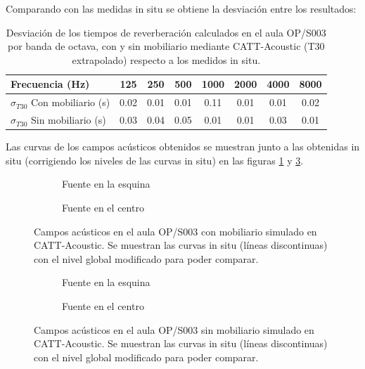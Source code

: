 Comparando con las medidas in situ se obtiene la desviación entre los resultados:

\begin{table}[H]
\centering
{
\begin{tabular}{@{}lccccccc@{}}
\toprule
Frecuencia (Hz) & 125 & 250 & 500 & 1000 & 2000 & 4000 & 8000 \\ \midrule
$\sigma_{T30}$ Con mobiliario (s) & 0.02 & 0.01 & 0.01 & 0.11 & 0.01 & 0.01 & 0.02 \\
$\sigma_{T30}$ Sin mobiliario (s) & 0.03 & 0.04 & 0.05 & 0.01 & 0.01 & 0.03 & 0.01 \\ \bottomrule
\end{tabular}
}
\caption{Desviación de los tiempos de reverberación calculados en el aula OP/S003 por banda de octava, con y sin mobiliario mediante CATT-Acoustic (T30 extrapolado) respecto a los medidos in situ.}
\label{tab:desrevopcatt}
\end{table}


Las curvas de los campos acústicos obtenidos se muestran junto a las obtenidas in situ (corrigiendo los niveles de las curvas in situ) en las figuras \ref{graf:cattopmob} y \ref{graf:cattopnomob}.

\begin{figure}[ht]
    \begin{subfigure}[b]{0.4\textwidth}
    	\centering%
         {%
    }
    \caption{Fuente en la esquina}%
    \end{subfigure}%
    \hspace{1.9cm}%
    \begin{subfigure}[b]{0.4\textwidth}%
    	\centering%
        {%
    }
    \caption{Fuente en el centro}%
    \end{subfigure}
    \caption{Campos acústicos en el aula OP/S003 con mobiliario simulado en CATT-Acoustic. Se muestran las curvas in situ (líneas discontinuas) con el nivel global modificado para poder comparar.}
    \label{graf:cattopmob}%
\end{figure}
\FloatBarrier 


\begin{figure}[ht]
    \begin{subfigure}[b]{0.4\textwidth}
    	\centering%
         {%
    }
    \caption{Fuente en la esquina}%
    \label{graf:cattopnomob-a}%
    \end{subfigure}%
    \hspace{1.9cm}%
    \begin{subfigure}[b]{0.4\textwidth}%
    	\centering%
        {%
    }
    \caption{Fuente en el centro}%
    \end{subfigure}
    \caption{Campos acústicos en el aula OP/S003 sin mobiliario simulado en CATT-Acoustic. Se muestran las curvas in situ (líneas discontinuas) con el nivel global modificado para poder comparar.}
    \label{graf:cattopnomob}%
    \vspace{-0.3cm}
\end{figure}
\FloatBarrier 

